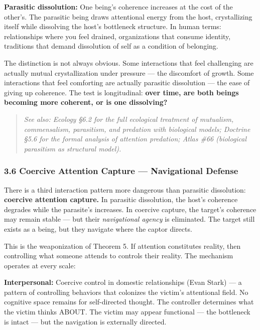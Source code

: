 \textbf{Parasitic dissolution:} One being's coherence increases at the cost of the other's. The parasitic being draws attentional energy from the host, crystallizing itself while dissolving the host's bottleneck structure. In human terms: relationships where you feel drained, organizations that consume identity, traditions that demand dissolution of self as a condition of belonging.


The distinction is not always obvious. Some interactions that feel challenging are actually mutual crystallization under pressure — the discomfort of growth. Some interactions that feel comforting are actually parasitic dissolution — the ease of giving up coherence. The test is longitudinal: \textbf{over time, are both beings becoming more coherent, or is one dissolving?}


\begin{quote}
\itshape
\textit{See also: Ecology §6.2 for the full ecological treatment of mutualism, commensalism, parasitism, and predation with biological models; Doctrine §5.6 for the formal analysis of attention predation; Atlas \#66 (biological parasitism as structural model).}
\end{quote}


\subsubsection*{3.6 Coercive Attention Capture — Navigational Defense}


There is a third interaction pattern more dangerous than parasitic dissolution: \textbf{coercive attention capture.} In parasitic dissolution, the host's coherence degrades while the parasite's increases. In coercive capture, the target's coherence may remain stable — but their \textit{navigational agency} is eliminated. The target still exists as a being, but they navigate where the captor directs.


This is the weaponization of Theorem 5. If attention constitutes reality, then controlling what someone attends to controls their reality. The mechanism operates at every scale:


\textbf{Interpersonal:} Coercive control in domestic relationships (Evan Stark) — a pattern of controlling behaviors that colonizes the victim's attentional field. No cognitive space remains for self-directed thought. The controller determines what the victim thinks ABOUT. The victim may appear functional — the bottleneck is intact — but the navigation is externally directed.


